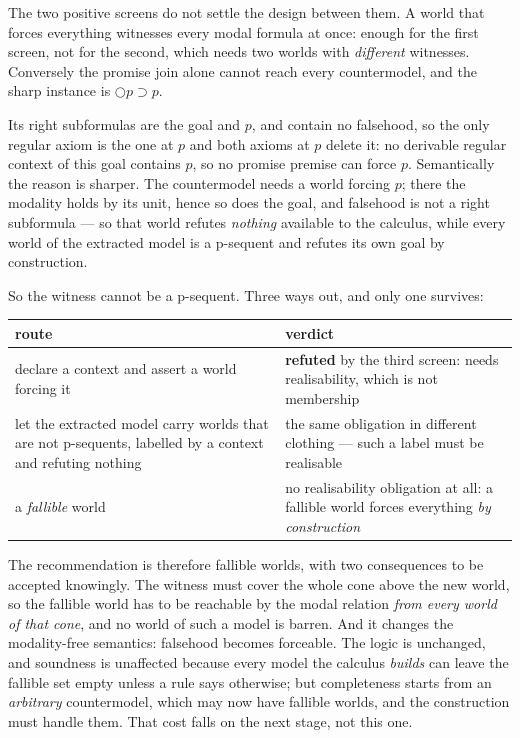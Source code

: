\documentclass[11pt,a4paper]{article}
\begin{document}
The two positive screens do not settle the design between them. A world
that forces everything witnesses every modal formula at once: enough for
the first screen, not for the second, which needs two worlds with
\emph{different} witnesses. Conversely the promise join alone cannot reach
every countermodel, and the sharp instance is $\bigcirc p \supset p$.

Its right subformulas are the goal and $p$, and contain no falsehood, so
the only regular axiom is the one at $p$ and both axioms at $p$ delete it:
no derivable regular context of this goal contains $p$, so no promise
premise can force $p$. Semantically the reason is sharper. The
countermodel needs a world forcing $p$; there the modality holds by its
unit, hence so does the goal, and falsehood is not a right subformula ---
so that world refutes \emph{nothing} available to the calculus, while
every world of the extracted model is a p-sequent and refutes its own goal
by construction.

So the witness cannot be a p-sequent. Three ways out, and only one
survives:

\begin{center}
\begin{tabular}{p{}p{}}
\hline
route & verdict\\
\hline
declare a context and assert a world forcing it &
\textbf{refuted} by the third screen: needs realisability, which is not
membership\\
let the extracted model carry worlds that are not p-sequents, labelled by
a context and refuting nothing &
the same obligation in different clothing --- such a label must be
realisable\\
a \emph{fallible} world &
no realisability obligation at all: a fallible world forces everything
\emph{by construction}\\
\hline
\end{tabular}
\end{center}

\noindent
The recommendation is therefore fallible worlds, with two consequences to
be accepted knowingly. The witness must cover the whole cone above the new
world, so the fallible world has to be reachable by the modal relation
\emph{from every world of that cone}, and no world of such a model is
barren. And it changes the modality-free semantics: falsehood becomes
forceable. The logic is unchanged, and soundness is unaffected because
every model the calculus \emph{builds} can leave the fallible set empty
unless a rule says otherwise; but completeness starts from an
\emph{arbitrary} countermodel, which may now have fallible worlds, and the
construction must handle them. That cost falls on the next stage, not this
one.
\end{document}
